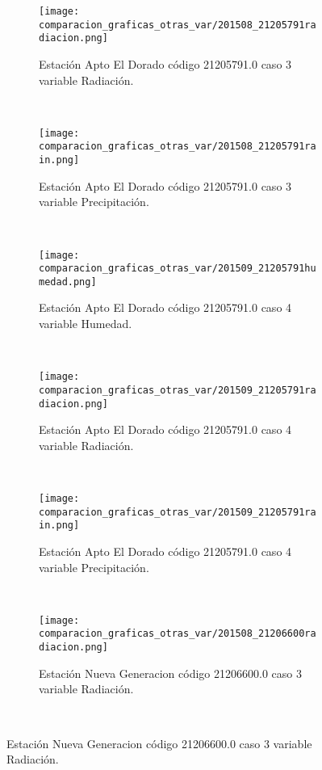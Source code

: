 \begin{figure}[H]
\centering
\begin{subfigure}[normla]{0.4\textwidth}
\caption{Estación Apto El Dorado código 21205791.0 caso 3 variable Radiación.}
\texttt{[image: comparacion\_graficas\_otras\_var/201508\_21205791radiacion.png]}
\end{subfigure}
~
\begin{subfigure}[normla]{0.4\textwidth}
\caption{Estación Apto El Dorado código 21205791.0 caso 3 variable Precipitación.}
\texttt{[image: comparacion\_graficas\_otras\_var/201508\_21205791rain.png]}
\end{subfigure}
~
\begin{subfigure}[normla]{0.4\textwidth}
\caption{Estación Apto El Dorado código 21205791.0 caso 4 variable Humedad.}
\texttt{[image: comparacion\_graficas\_otras\_var/201509\_21205791humedad.png]}
\end{subfigure}
~
\begin{subfigure}[normla]{0.4\textwidth}
\caption{Estación Apto El Dorado código 21205791.0 caso 4 variable Radiación.}
\texttt{[image: comparacion\_graficas\_otras\_var/201509\_21205791radiacion.png]}
\end{subfigure}
~
\begin{subfigure}[normla]{0.4\textwidth}
\caption{Estación Apto El Dorado código 21205791.0 caso 4 variable Precipitación.}
\texttt{[image: comparacion\_graficas\_otras\_var/201509\_21205791rain.png]}
\end{subfigure}
~
\begin{subfigure}[normla]{0.4\textwidth}
\caption{Estación Nueva Generacion código 21206600.0 caso 3 variable Radiación.}
\texttt{[image: comparacion\_graficas\_otras\_var/201508\_21206600radiacion.png]}
\end{subfigure}
~
\end{figure}
           
